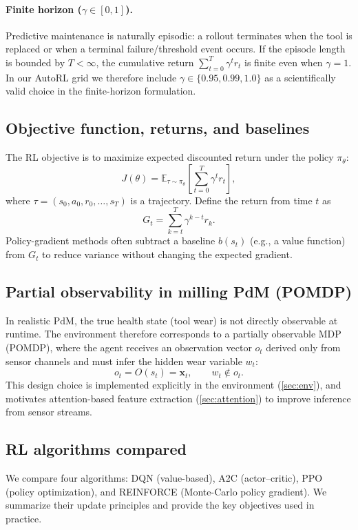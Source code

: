 \documentclass[11pt]{article}
\begin{document}
\paragraph{Finite horizon ($\gamma\in[0,1]$).}
Predictive maintenance is naturally episodic: a rollout terminates when the tool is replaced or when a terminal failure/threshold event occurs. If the episode length is bounded by $T<\infty$, the cumulative return $\sum_{t=0}^{T}\gamma^t r_t$ is finite even when $\gamma=1$. In our AutoRL grid we therefore include $\gamma\in\{0.95,0.99,1.0\}$ as a scientifically valid choice in the finite-horizon formulation.

\subsection{Objective function, returns, and baselines}
\label{sec:objective}
The RL objective is to maximize expected discounted return under the policy $\pi_\theta$:
\begin{equation}
J(\theta)=\mathbb{E}_{\tau\sim\pi_\theta}\left[\sum_{t=0}^{T}\gamma^t r_t\right],
\end{equation}
where $\tau=(s_0,a_0,r_0,\ldots,s_T)$ is a trajectory.
Define the return from time $t$ as
\begin{equation}
G_t = \sum_{k=t}^{T} \gamma^{k-t} r_k.
\end{equation}
Policy-gradient methods often subtract a baseline $b(s_t)$ (e.g., a value function) from $G_t$ to reduce variance without changing the expected gradient.

\subsection{Partial observability in milling PdM (POMDP)}
\label{sec:pomdp}
In realistic PdM, the true health state (tool wear) is not directly observable at runtime. The environment therefore corresponds to a partially observable MDP (POMDP), where the agent receives an observation vector $o_t$ derived only from sensor channels and must infer the hidden wear variable $w_t$:
\begin{equation}
	o_t = O(s_t) = \mathbf{x}_t, \qquad w_t \notin o_t.
\end{equation}
This design choice is implemented explicitly in the environment (\cref{sec:env}), and motivates attention-based feature extraction (\cref{sec:attention}) to improve inference from sensor streams.

\subsection{RL algorithms compared}
\label{sec:algos}
We compare four algorithms: DQN (value-based), A2C (actor--critic), PPO (policy optimization), and REINFORCE (Monte-Carlo policy gradient). We summarize their update principles and provide the key objectives used in practice.
\end{document}
